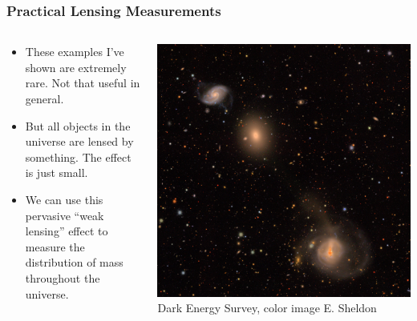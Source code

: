 \documentclass{beamer}
\begin{document}
\frame
{

    \frametitle{Practical Lensing Measurements}


    \begin{columns}
        \begin{column}{0.5\textwidth}
            \begin{itemize}

                \item These examples I've shown are extremely rare. Not that useful
                    in general.

                \item But all objects in the universe are lensed by something.
                    The effect is just small.

                \item We can use this pervasive ``weak lensing'' effect to measure
                    the distribution of mass throughout the universe.

            \end{itemize}
        \end{column}
        \begin{column}{0.5\textwidth}
            \begin{center}
                \includegraphics[width=\textwidth]{DES0428-4748-gri-crop.jpg}
                \newline
                {\tiny Dark Energy Survey, color image E. Sheldon}
            \end{center}

            
        \end{column}
    \end{columns}
}
\end{document}
